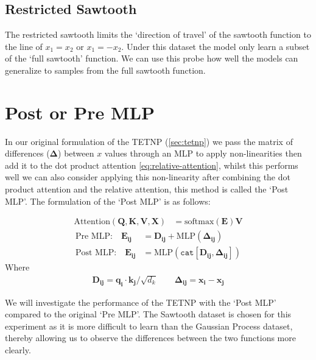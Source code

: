 \documentclass[../../main.tex]{subfiles}
\begin{document}


\subsection{Restricted Sawtooth}

The restricted sawtooth limits the `direction of travel' of the sawtooth function to the line of $x_1 = x_2$ or $x_1 = -x_2$. Under this dataset the model only learn a subset of the `full sawtooth' function. We can use this probe how well the models can generalize to samples from the full sawtooth function.


\section{Post or Pre MLP}

In our original formulation of the TETNP (\autoref{sec:tetnp}) we pass the matrix of differences ($\bm{\Delta}$) between $x$ values through an MLP to apply non-linearities then add it to the dot product attention \autoref{eq:relative-attention}, whilst this performs well we can also consider applying this non-linearity after combining the dot product attention and the relative attention, this method is called the `Post MLP'. The formulation of the `Post MLP' is as follows:

\begin{align}
	\text{Attention}(\bm{Q}, \bm{K}, \bm{V}, \bm{X}) &= \text{softmax}\left(\bm{E} \right) \bm{V}
\end{align}
\begin{align}
	\text{Pre MLP:} \quad \bm{E_{ij}} &= \bm{D_{ij}}+ \text{MLP}(\bm{\Delta_{ij}})\\
    \text{Post MLP:} \quad \bm{E_{ij}} &= \text{MLP}(\texttt{cat}[ \bm{D_{ij}}, \bm{\Delta_{ij}}])
\end{align}
Where 
\begin{align}
     \bm{D_{ij}} = \bm{q_i} \cdot \bm{k_j}  /\sqrt{d_k} \quad \quad    \bm{\Delta_{ij}} = \bm{x_i} - \bm{x_j}
\end{align}


We will investigate the performance of the TETNP with the `Post MLP' compared to the original `Pre MLP'. The Sawtooth dataset is chosen for this experiment as it is more difficult to learn than the Gaussian Process dataset, thereby allowing us to observe the differences between the two functions more clearly.
\end{document}
